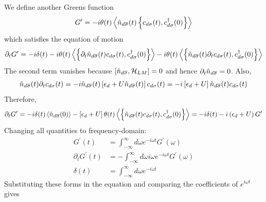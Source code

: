 \documentclass[12pt,twoside]{report}
\numberwithin{equation}{section}
\begin{document}
We define another Greens function
\begin{equation}\begin{aligned}
	G^\prime = -i \theta(t) \left<\hat n_{d\overline\sigma}(t)\left\{c_{d\sigma}(t), c^\dagger_{d\sigma}(0) \right\} \right>
\end{aligned}\end{equation}
which satisfies the equation of motion
\begin{equation}\begin{aligned}
	\partial_t G^\prime = -i \delta(t) -i\theta(t) \left<\left\{\partial_t \hat n_{d\overline\sigma}(t)c_{d\sigma}(t), c^\dagger_{d\sigma}(0) \right\} \right> -i\theta(t) \left<\left\{\hat n_{d\overline\sigma}(t)\partial_t c_{d\sigma}(t), c^\dagger_{d\sigma}(0) \right\} \right>
\end{aligned}\end{equation}
The second term vanishes because \(\left[\hat n_{d\overline\sigma}, \mathcal{H}_{LM}\right] = 0\) and hence \(\partial_t \hat n_{d\overline\sigma} = 0\). Also,
\begin{equation}\begin{aligned}
	\hat n_{d\overline\sigma}(t)\partial_t c_{d\sigma}(t) = -i\hat n_{d\overline\sigma}(t)\left[\epsilon_d + U \hat n_{d\overline\sigma}(t)\right]c_{d\sigma}(t) = -i\left[\epsilon_d + U\right]\hat n_{d\overline\sigma}(t)c_{d\sigma}(t)
\end{aligned}\end{equation}
Therefore,
\begin{equation}\begin{aligned}
	\partial_t G^\prime = -i \delta(t) \left< \hat n_{d\overline\sigma}(0)\right>- \left[\epsilon_d + U\right]\theta(t) \left<\left\{\hat n_{d\overline\sigma}(t)c_{d\sigma}(t), c^\dagger_{d\sigma}(0) \right\} \right> = -i \delta(t) -i \left( \epsilon_d + U \right) G^\prime
\end{aligned}\end{equation}
Changing all quantities to frequency-domain:
\begin{equation}\begin{aligned}
	G^\prime(t) &= \int_{-\infty}^\infty d\omega e^{-i\omega t} G^\prime(\omega)\\
	\partial_t G^\prime(t) &= -\int_{-\infty}^\infty d\omega i \omega e^{-i\omega t} G^\prime(\omega)\\
	\delta(t) &= \int_{-\infty}^\infty d\omega e^{-i\omega t}
\end{aligned}\end{equation}
Substituting these forms in the equation and comparing the coefficients of \(e^{i\omega t}\) gives
\end{document}
